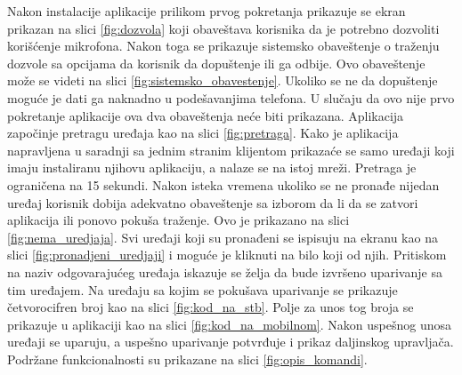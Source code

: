 \documentclass[implementacija.tex]{subfiles}
\begin{document}
Nakon instalacije aplikacije prilikom prvog pokretanja prikazuje se ekran prikazan na slici \ref{fig:dozvola} koji obaveštava korisnika da je potrebno dozvoliti korišćenje mikrofona. Nakon toga se prikazuje sistemsko obaveštenje o traženju dozvole sa opcijama da korisnik da dopuštenje ili ga odbije. Ovo obaveštenje može se videti na slici \ref{fig:sistemsko_obavestenje}. Ukoliko se ne da dopuštenje moguće je dati ga naknadno u podešavanjima telefona. U slučaju da ovo nije prvo pokretanje aplikacije ova dva obaveštenja neće biti prikazana.
Aplikacija započinje pretragu uređaja kao na slici \ref{fig:pretraga}. Kako je aplikacija napravljena u saradnji sa jednim stranim klijentom prikazaće se samo uređaji koji imaju instaliranu njihovu aplikaciju, a nalaze se na istoj mreži. Pretraga je ograničena na 15 sekundi. Nakon isteka vremena ukoliko se ne pronađe nijedan uređaj korisnik dobija adekvatno obaveštenje sa izborom da li da se zatvori aplikacija ili ponovo pokuša traženje. Ovo je prikazano na slici \ref{fig:nema_uredjaja}. 
Svi uređaji koji su pronađeni se ispisuju na ekranu kao na slici \ref{fig:pronadjeni_uredjaji} i moguće je kliknuti na bilo koji od njih. Pritiskom na naziv odgovarajućeg uređaja iskazuje se želja da bude izvršeno uparivanje sa tim uređajem. Na uređaju sa kojim se pokušava uparivanje se prikazuje četvorocifren broj kao na slici \ref{fig:kod_na_stb}. Polje za unos tog broja se prikazuje u aplikaciji kao na slici \ref{fig:kod_na_mobilnom}. Nakon uspešnog unosa uređaji se uparuju, a uspešno uparivanje potvrđuje i prikaz daljinskog upravljača. Podržane funkcionalnosti su prikazane na slici \ref{fig:opis_komandi}.
\end{document}
